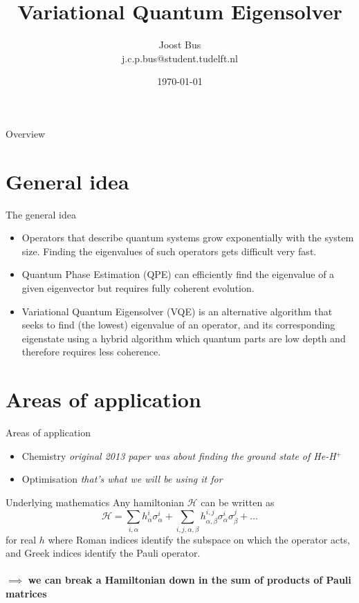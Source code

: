 \documentclass{beamer}
\title[]{Variational Quantum Eigensolver}
\institute[]{Technische Universiteit Delft, Nederland}
\author{Joost Bus \\ \tiny{j.c.p.bus@student.tudelft.nl}}
\date{\today}
\newcommand{\sidenote}[1]{{\textcolor{mygray}{\emph{#1}}}}
\begin{document}
{
\frame{\titlepage}
}
{}

\begin{frame}{Overview}
\tableofcontents
\end{frame}

\section{General idea}
\begin{frame}{The general idea}
\begin{itemize}
	\item Operators that describe quantum systems grow exponentially with the system size. Finding the eigenvalues of such operators gets difficult very fast.
	\item Quantum Phase Estimation (QPE) can efficiently find the eigenvalue
	of a given eigenvector but requires fully coherent evolution.
	\item Variational Quantum Eigensolver (VQE) is an alternative algorithm that seeks to find (the lowest) eigenvalue of an operator, and its corresponding eigenstate using a hybrid algorithm which quantum parts are low depth and therefore requires less coherence.
\end{itemize}
\end{frame}

\section{Areas of application}
\begin{frame}{Areas of application}
	\begin{itemize}
		\item Chemistry \sidenote{original 2013 paper was about finding the ground state of He-H$^+$}
		\item Optimisation \sidenote{that's what we will be using it for}
	\end{itemize}
\end{frame}

\begin{frame}{Underlying mathematics}
	Any hamiltonian $\mathcal{H}$ can be written as
	\begin{equation}
		\mathcal{H} = \sum_{i, \alpha} h_\alpha^i\sigma_\alpha^i + \sum_{i, j, \alpha, \beta} h_{\alpha,\beta}^{i,j}\sigma_\alpha^i\sigma_\beta^j + \dots
	\end{equation}
	for real $h$ where Roman indices identify the subspace on
	which the operator acts, and Greek indices identify the
	Pauli operator.\\~\\
	$\implies$ \textbf{we can break a Hamiltonian down in the sum of products of Pauli matrices} %
\end{frame}
\end{document}
